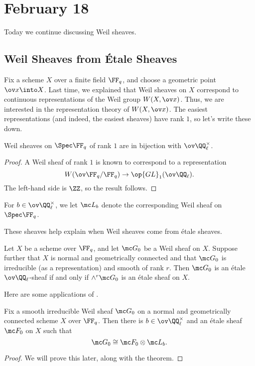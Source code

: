 \documentclass[../notes.tex]{subfiles}
\begin{document}
\section{February 18}
Today we continue discussing Weil sheaves.

\subsection{Weil Sheaves from \'Etale Sheaves}
Fix a scheme $X$ over a finite field $\FF_q$, and choose a geometric point $\ov x\into X$. Last time, we explained that Weil sheaves on $X$ correspond to continuous representations of the Weil group $W(X,\ov x)$. Thus, we are interested in the representation theory of $W(X,\ov x)$. The easiest representations (and indeed, the easiest sheaves) have rank $1$, so let's write these down.
\begin{proposition}
	Weil sheaves on $\Spec\FF_q$ of rank $1$ are in bijection with $\ov\QQ_\ell^\times$.
\end{proposition}
\begin{proof}
	A Weil sheaf of rank $1$ is known to correspond to a representation
	\[W(\ov\FF_q/\FF_q)\to\op{GL}_1(\ov\QQ_\ell).\]
	The left-hand side is $\ZZ$, so the result follows.
\end{proof}
\begin{notation}
	For $b\in\ov\QQ_\ell^\times$, we let $\mc L_b$ denote the corresponding Weil sheaf on $\Spec\FF_q$.
\end{notation}
These sheaves help explain when Weil sheaves come from \'etale sheaves.
\begin{theorem} \label{thm:weil-to-et-sheaf}
	Let $X$ be a scheme over $\FF_q$, and let $\mc G_0$ be a Weil sheaf on $X$. Suppose further that $X$ is normal and geometrically connected and that $\mc G_0$ is irreducible (as a representation) and smooth of rank $r$. Then $\mc G_0$ is an \'etale $\ov\QQ_\ell$-sheaf if and only if $\land^r\mc G_0$ is an \'etale sheaf on $X$.
\end{theorem}
Here are some applications of .
\begin{corollary} \label{cor:get-weil-is-twist}
	Fix a smooth irreducible Weil sheaf $\mc G_0$ on a normal and geometrically connected scheme $X$ over $\FF_q$. Then there is $b\in\ov\QQ_\ell^\times$ and an \'etale sheaf $\mc F_0$ on $X$ such that
	\[\mc G_0\cong\mc F_0\otimes\mc L_b.\]
\end{corollary}
\begin{proof}
	We will prove this later, along with the theorem.
\end{proof}
\end{document}
